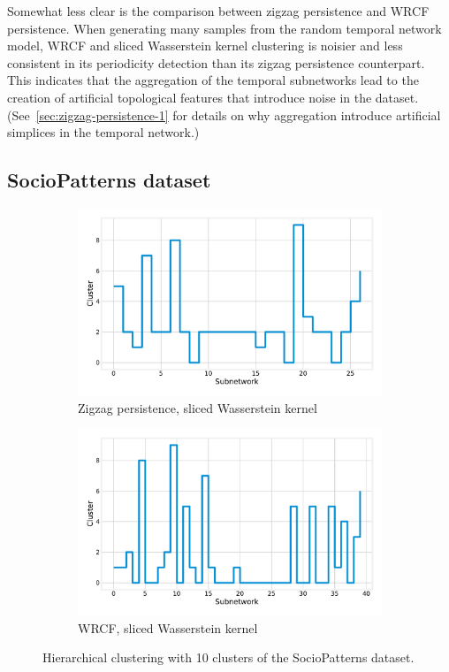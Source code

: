 \documentclass[a4paper,11pt,openany,extrafontsizes]{memoir}
\begin{document}
Somewhat less clear is the comparison between zigzag persistence and
WRCF persistence. When generating many samples from the random
temporal network model, WRCF and sliced Wasserstein kernel clustering
is noisier and less consistent in its periodicity detection than its
zigzag persistence counterpart. This indicates that the aggregation of
the temporal subnetworks lead to the creation of artificial
topological features that introduce noise in the
dataset. (See~\autoref{sec:zigzag-persistence-1} for details on why
aggregation introduce artificial simplices in the temporal network.)

\subsection{SocioPatterns dataset}%
\label{sec:soci-datas}

\begin{figure}[ht]
  \centering
  \begin{subfigure}[b]{0.8\linewidth}
  \centering
  \includegraphics[width=.85\linewidth]{fig/sp_zz_k.pdf}
  \caption{Zigzag persistence, sliced Wasserstein kernel}%
  \label{fig:sp_zz_k}
\end{subfigure}
\begin{subfigure}[b]{0.8\linewidth}
  \centering
  \includegraphics[width=.85\linewidth]{fig/sp_wrcf_k.pdf}
  \caption{WRCF, sliced Wasserstein kernel}%
  \label{fig:sp_wrcf_k}
\end{subfigure}
\caption{Hierarchical clustering with 10 clusters of the SocioPatterns
  dataset.}%
\label{fig:sp}
\end{figure}
\end{document}
